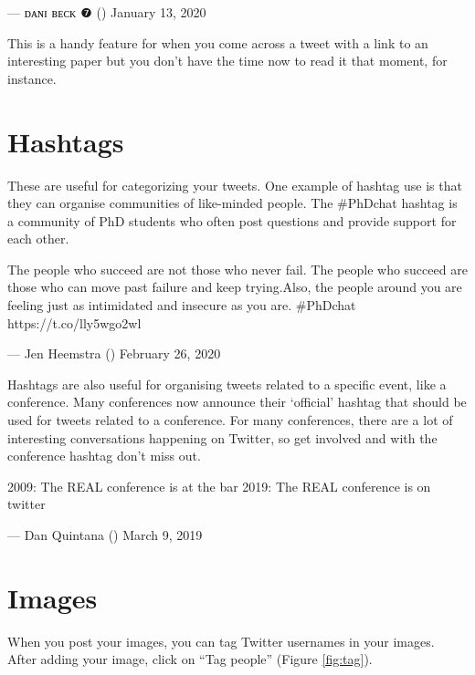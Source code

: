 \documentclass[]{book}
\begin{document}
--- ᴅᴀɴɪ ʙᴇᴄᴋ ❼ (\citet{_DaniBeck}) January 13, 2020

This is a handy feature for when you come across a tweet with a link to an interesting paper but you don't have the time now to read it that moment, for instance.

\hypertarget{hashtags}{%
\section{Hashtags}\label{hashtags}}

These are useful for categorizing your tweets. One example of hashtag use is that they can organise communities of like-minded people. The \#PhDchat hashtag is a community of PhD students who often post questions and provide support for each other.

The people who succeed are not those who never fail. The people who succeed are those who can move past failure and keep trying.Also, the people around you are feeling just as intimidated and insecure as you are. \#PhDchat https://t.co/lly5wgo2wl

--- Jen Heemstra (\citet{jenheemstra}) February 26, 2020

Hashtags are also useful for organising tweets related to a specific event, like a conference. Many conferences now announce their `official' hashtag that should be used for tweets related to a conference. For many conferences, there are a lot of interesting conversations happening on Twitter, so get involved and with the conference hashtag don't miss out.

2009: The REAL conference is at the bar 2019: The REAL conference is on twitter

--- Dan Quintana (\citet{dsquintana}) March 9, 2019

\hypertarget{images}{%
\section{Images}\label{images}}

When you post your images, you can tag Twitter usernames in your images. After adding your image, click on ``Tag people'' (Figure \ref{fig:tag}).
\end{document}
